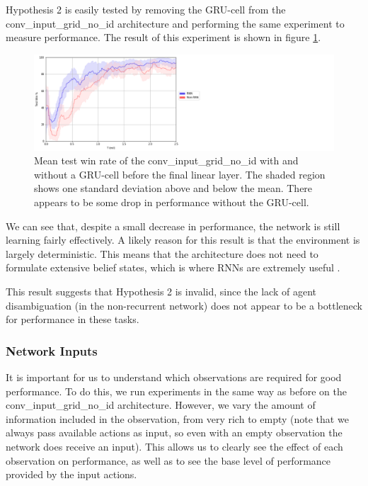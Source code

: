 Hypothesis 2 is easily tested by removing the GRU-cell from the conv\_input\_grid\_no\_id architecture and performing the same experiment to measure performance. The result of this experiment is shown in figure \ref{fig:rnnvsnonrnn}.

\begin{figure}
    \centering
    \hbox{\hspace{5em}\includegraphics[scale=0.5]{images/graphs/rnn.png}}
    \caption{Mean test win rate of the conv\_input\_grid\_no\_id with and without a GRU-cell before the final linear layer. The shaded region shows one standard deviation above and below the mean. There appears to be some drop in performance without the GRU-cell.}
    \label{fig:rnnvsnonrnn}
\end{figure}


We can see that, despite a small decrease in performance, the network is still learning fairly effectively. A likely reason for  this result is that the environment is largely deterministic. This means that the architecture does not need to formulate extensive belief states, which is where RNNs are extremely useful \cite{beliefstate}. 

This result suggests that Hypothesis 2 is invalid, since the lack of agent disambiguation (in the non-recurrent network) does not appear to be a bottleneck for performance in these tasks.

\subsubsection{Network Inputs}

It is important for us to understand which observations are required for good performance. To do this, we run experiments in the same way as before on the conv\_input\_grid\_no\_id architecture. However, we vary the amount of information included in the observation, from very rich to empty (note that we always pass available actions as input, so even with an empty observation the network does receive an input). This allows us to clearly see the effect of each observation on performance, as well as to see the base level of performance provided by the input actions.


